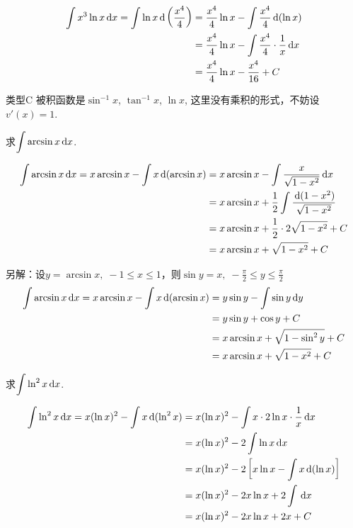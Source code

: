 \begin{solution}
\[\begin{split}
    \displaystyle\int x^3\ln x\,{\rm d} x=\int \ln x\,{\rm d}\left(\dfrac{x^4}{4}\right)&=\dfrac{x^4}{4}\ln x-\int \dfrac{x^4}{4}\,{\rm d}(\ln x)\\
    &= \dfrac{x^4}{4}\ln x-\int  \dfrac{x^4}{4}\cdot \dfrac{1}{x}\,{\rm d} x\\
    &= \dfrac{x^4}{4}\ln x- \dfrac{x^4}{16}+C
\end{split}\]
\end{solution}

\begin{blk}
    {类型C} 被积函数是$\sin^{-1}x$, $\tan^{-1}x$, $\ln x$, 这里没有乘积的形式，不妨设$v'(x)=1$.
\end{blk}

\begin{example}
求$\displaystyle\int \arcsin x\,{\rm d} x$.
\end{example}

\begin{solution}
\[\begin{split}
    \displaystyle\int \arcsin x\,{\rm d} x=x\arcsin x-\int x\,{\rm d}(\arcsin x)&=x\arcsin x-\int\dfrac{x}{\sqrt{1-x^2}}\,{\rm d} x  \\
    &=x\arcsin x+\dfrac{1}{2}\int \dfrac{\,{\rm d}(1-x^2)}{\sqrt{1-x^2}}\\
    &=x\arcsin x+\dfrac{1}{2}\cdot 2\sqrt{1-x^2}+C\\
    &=x\arcsin x+\sqrt{1-x^2}+C
\end{split}\]

另解：设$y=\arcsin x,\; -1\le x\le 1$，则$\sin y=x,\; -\frac{\pi}{2}\le y\le \frac{\pi}{2}$
\[\begin{split}
    \displaystyle\int \arcsin x\,{\rm d} x=x\arcsin x-\int x\,{\rm d}(\arcsin x)&=y\sin y-\int \sin y \,{\rm d} y\\
    &=y\sin y+\cos y+C\\
    &=x\arcsin x+\sqrt{1-\sin^2 y}+C\\
    &=x\arcsin x+\sqrt{1-x^2}+C
\end{split}\]
\end{solution}

\begin{example}
    求$\displaystyle\int \ln^2 x\,{\rm d} x$.
\end{example}

\begin{solution}
    \[\begin{split}
        \displaystyle\int \ln^2 x\,{\rm d} x=x(\ln x)^2-\int x\,{\rm d} (\ln^2 x)&=x(\ln x)^2-\int x\cdot 2\ln x\cdot \dfrac{1}{x}\,{\rm d} x\\
        &=x(\ln x)^2-2\int \ln x\,{\rm d} x\\
        &=x(\ln x)^2-2\left[x\ln x-\int x\,{\rm d}(\ln x)\right]\\
        &=x(\ln x)^2-2x\ln x+2\int \,{\rm d} x\\
        &=x(\ln x)^2-2x\ln x+2x+C   
    \end{split}\]
\end{solution}

